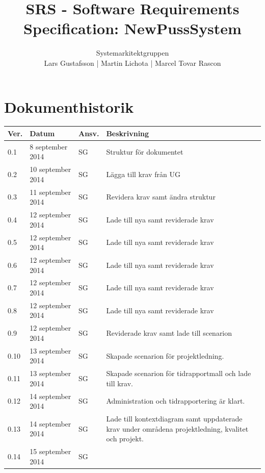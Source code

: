 \documentclass[a4paper]{article}
\title{SRS - Software Requirements Specification: NewPussSystem}
\author{Systemarkitektgruppen \\ Lars Gustafsson | Martin Lichota | Marcel Tovar Rascon}
\date{}
\begin{document}
\maketitle
\thispagestyle{fancy}
\tableofcontents
\newpage

\section*{Dokumenthistorik}

\begin{tabular}{ l l l p{8.5cm} }
Ver. & Datum & Ansv. & Beskrivning \\\hline
0.1 & 8 september 2014 & SG & Struktur för dokumentet\\
0.2 & 10 september 2014 & SG & Lägga till krav från UG\\
0.3 & 11 september 2014 & SG & Revidera krav samt ändra struktur\\
0.4 & 12 september 2014 & SG & Lade till nya samt reviderade krav\\
0.5 & 12 september 2014 & SG & Lade till nya samt reviderade krav\\
0.6 & 12 september 2014 & SG & Lade till nya samt reviderade krav\\
0.7 & 12 september 2014 & SG & Lade till nya samt reviderade krav\\
0.8 & 12 september 2014 & SG & Lade till nya samt reviderade krav\\
0.9 & 12 september 2014 & SG & Reviderade krav samt lade till scenarion\\
0.10 & 13 september 2014 & SG & Skapade scenarion för projektledning.\\
0.11 & 13 september 2014 & SG & Skapade scenarion för tidrapportmall och lade till krav.\\
0.12 & 14 september 2014 & SG & Administration och tidrapportering är klart.\\
0.13 & 14 september 2014 & SG & Lade till kontextdiagram samt uppdaterade krav under områdena projektledning, kvalitet och projekt.\\
0.14 & 15 september 2014 & SG & 


\end{tabular}
\end{document}
